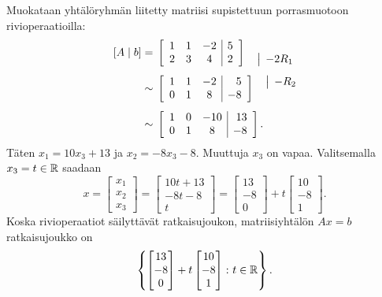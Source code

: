 \documentclass[11pt,a4paper]{amsart}
\begin{document}
\begin{solution}
  Muokataan yhtälöryhmän liitetty matriisi supistettuun porrasmuotoon
  rivioperaatioilla:
  \[
    \begin{aligned}
      [A \mid b] &={}
      \left[
        \begin{array}{ccc|r}
          1 & 1 & -2 & 5 \\
          2 & 3 & 4 & 2
        \end{array}
      \right]
      \quad
      \begin{array}{@{}l@{}}
        {} \\
        \smash{\rowop{-2R_1}}
      \end{array}
      \\[1ex]
      &\sim{}
      \left[
        \begin{array}{ccc|r}
          1 & 1 & -2 & 5 \\
          0 & 1 & 8 & -8
        \end{array}
      \right]
      \quad
      \begin{array}{@{}l@{}}
        \smash{\rowop{-R_2}} \\
        {}
      \end{array}
      \\[1ex]
      &\sim{}
      \left[
        \begin{array}{ccc|r}
          1 & 0 & -10 & 13 \\
          0 & 1 & 8 & -8
        \end{array}
      \right].
    \end{aligned}
  \]
  Täten \(x_1 = 10x_3 + 13\) ja \(x_2 = -8x_3 - 8\).
  Muuttuja \(x_3\) on vapaa. Valitsemalla \(x_3 = t \in \mathbb{R}\) saadaan
  \[
    x =
    \begin{bmatrix} x_1 \\ x_2 \\ x_3
    \end{bmatrix}
    =
    \begin{bmatrix} 10t+13 \\ -8t-8 \\ t
    \end{bmatrix}
    =
    \begin{bmatrix} 13 \\ -8 \\ 0
    \end{bmatrix}
    + t
    \begin{bmatrix} 10 \\ -8 \\ 1
    \end{bmatrix}.
  \]
  Koska rivioperaatiot säilyttävät ratkaisujoukon, matriisiyhtälön
  \(Ax = b\) ratkaisujoukko on
  \[
    \left\{
      \begin{bmatrix} 13 \\ -8 \\ 0
      \end{bmatrix}
      + t
      \begin{bmatrix} 10 \\ -8 \\ 1
      \end{bmatrix}
      \colon t \in \mathbb{R}
    \right\}.
  \]
\end{solution}
\end{document}
